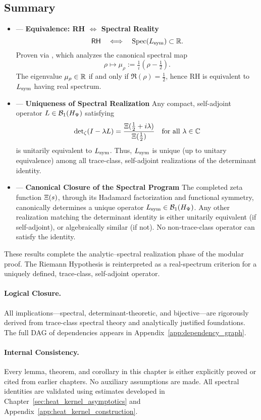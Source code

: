 \subsection*{Summary}

\begin{itemize}
  \item {} — \textbf{Equivalence: RH \( \iff \) Spectral Reality}
  \[
  \mathsf{RH} \quad \Longleftrightarrow \quad \operatorname{Spec}(L_{\mathrm{sym}}) \subset \mathbb{R}.
  \]
  Proven via , which analyzes the canonical spectral map
  \[
  \rho \mapsto \mu_\rho := \tfrac{1}{i}(\rho - \tfrac{1}{2}).
  \]
  The eigenvalue \( \mu_\rho \in \mathbb{R} \) if and only if \( \Re(\rho) = \tfrac{1}{2} \), hence RH is equivalent to \( L_{\mathrm{sym}} \) having real spectrum.

  \item {} — \textbf{Uniqueness of Spectral Realization}
  Any compact, self-adjoint operator \( L \in \mathcal{B}_1(H_{\Psi}) \) satisfying
  \[
  \det\nolimits_\zeta(I - \lambda L) = \frac{\Xi(\tfrac{1}{2} + i\lambda)}{\Xi(\tfrac{1}{2})}
  \quad \text{for all } \lambda \in \mathbb{C}
  \]
  is unitarily equivalent to \( L_{\mathrm{sym}} \). Thus, \( L_{\mathrm{sym}} \) is unique (up to unitary equivalence) among all trace-class, self-adjoint realizations of the determinant identity.

  \item {} — \textbf{Canonical Closure of the Spectral Program}
  The completed zeta function \( \Xi(s) \), through its Hadamard factorization and functional symmetry, canonically determines a unique operator \( L_{\mathrm{sym}} \in \mathcal{B}_1(H_{\Psi}) \). Any other realization matching the determinant identity is either unitarily equivalent (if self-adjoint), or algebraically similar (if not). No non-trace-class operator can satisfy the identity.
\end{itemize}

\medskip

These results complete the analytic–spectral realization phase of the modular proof. The Riemann Hypothesis is reinterpreted as a real-spectrum criterion for a uniquely defined, trace-class, self-adjoint operator.

\paragraph{Logical Closure.}
All implications—spectral, determinant-theoretic, and bijective—are rigorously derived from trace-class spectral theory and analytically justified foundations. The full DAG of dependencies appears in Appendix~\ref{app:dependency_graph}.

\paragraph{Internal Consistency.}
Every lemma, theorem, and corollary in this chapter is either explicitly proved or cited from earlier chapters. No auxiliary assumptions are made. All spectral identities are validated using estimates developed in Chapter~\ref{sec:heat_kernel_asymptotics} and Appendix~\ref{app:heat_kernel_construction}.
